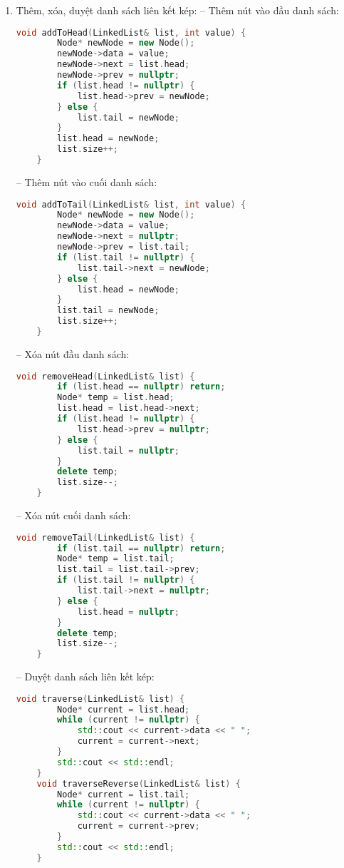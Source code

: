\begin{enumerate}[label=\alph*.]
  \item Thêm, xóa, duyệt danh sách liên kết kép:
  -- Thêm nút vào đầu danh sách:
  \begin{lstlisting}[language=C++]
    void addToHead(LinkedList& list, int value) {
        Node* newNode = new Node();
        newNode->data = value;
        newNode->next = list.head;
        newNode->prev = nullptr;
        if (list.head != nullptr) {
            list.head->prev = newNode; 
        } else {
            list.tail = newNode; 
        }
        list.head = newNode;
        list.size++;
    }
  \end{lstlisting}
  \vspace{-4.em}
  -- Thêm nút vào cuối danh sách:
  \begin{lstlisting}[language=C++]
    void addToTail(LinkedList& list, int value) {
        Node* newNode = new Node();
        newNode->data = value;
        newNode->next = nullptr;
        newNode->prev = list.tail;
        if (list.tail != nullptr) {
            list.tail->next = newNode; 
        } else {
            list.head = newNode; 
        }
        list.tail = newNode;
        list.size++;
    }
  \end{lstlisting}
  \vspace{-4.em}
  -- Xóa nút đầu danh sách:
  \begin{lstlisting}[language=C++]
    void removeHead(LinkedList& list) {
        if (list.head == nullptr) return; 
        Node* temp = list.head;
        list.head = list.head->next;
        if (list.head != nullptr) {
            list.head->prev = nullptr; 
        } else {
            list.tail = nullptr; 
        }
        delete temp;
        list.size--;
    }
  \end{lstlisting}
  \vspace{-4.em}
  -- Xóa nút cuối danh sách:
  \begin{lstlisting}[language=C++]
    void removeTail(LinkedList& list) {
        if (list.tail == nullptr) return; 
        Node* temp = list.tail;
        list.tail = list.tail->prev;
        if (list.tail != nullptr) {
            list.tail->next = nullptr; 
        } else {
            list.head = nullptr; 
        }
        delete temp;
        list.size--;
    }
  \end{lstlisting}
  \vspace{-4.em}
  -- Duyệt danh sách liên kết kép:
  \begin{lstlisting}[language=C++]
    void traverse(LinkedList& list) {
        Node* current = list.head;
        while (current != nullptr) {
            std::cout << current->data << " ";
            current = current->next;
        }
        std::cout << std::endl;
    }
    void traverseReverse(LinkedList& list) {
        Node* current = list.tail;
        while (current != nullptr) {
            std::cout << current->data << " ";
            current = current->prev;
        }
        std::cout << std::endl;
    }
  \end{lstlisting}
\end{enumerate}
\vspace{-7.em}
